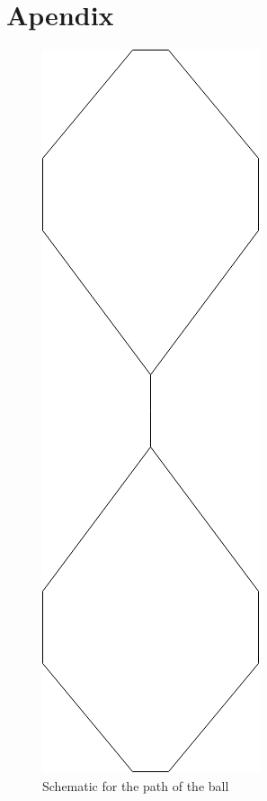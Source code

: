 \chapter{Apendix}

\begin{figure}[htpb]
    \centering
    \includegraphics[scale=0.5]{figures/plots/ballMove}
    \caption{ Schematic for the path of the ball }
    \label{fig:ballMove}
  \end{figure}

